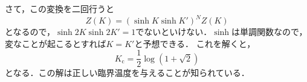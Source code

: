 	さて，この変換を二回行うと
	\begin{equation}
			Z(K) = (\sinh K \sinh K')^NZ(K)
	\end{equation}
	となるので，$\sinh 2K \sinh 2K' = 1$でないといけない．$\sinh$は単調関数なので，変なことが起こるとすれば$K = K'$と予想できる．
	これを解くと，
	\begin{equation}
			K_{\text{c}} = \frac{1}{2}\log(1 + \sqrt{2})
	\end{equation}
	となる．この解は正しい臨界温度を与えることが知られている．











